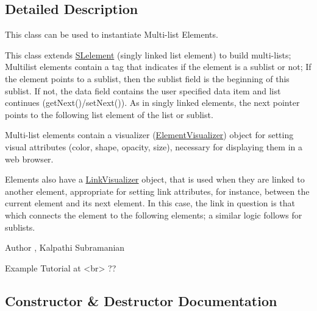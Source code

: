 \subsection{Detailed Description}
This class can be used to instantiate Multi-\/list Elements. 

This class extends \mbox{\hyperlink{namespace_bridges_1_1_s_lelement}{S\+Lelement}} (singly linked list element) to build multi-\/lists; Multilist elements contain a tag that indicates if the element is a sublist or not; If the element points to a sublist, then the sublist field is the beginning of this sublist. If not, the data field contains the user specified data item and list continues (get\+Next()/set\+Next()). As in singly linked elements, the next pointer points to the following list element of the list or sublist.

Multi-\/list elements contain a visualizer (\mbox{\hyperlink{namespace_bridges_1_1_element_visualizer}{Element\+Visualizer}}) object for setting visual attributes (color, shape, opacity, size), necessary for displaying them in a web browser.

Elements also have a \mbox{\hyperlink{namespace_bridges_1_1_link_visualizer}{Link\+Visualizer}} object, that is used when they are linked to another element, appropriate for setting link attributes, for instance, between the current element and its next element. In this case, the link in question is that which connects the element to the following elements; a similar logic follows for sublists.

\begin{DoxyAuthor}{Author}
, Kalpathi Subramanian
\end{DoxyAuthor}
\begin{DoxyVerb}\sa Example Tutorial at <br> ??\end{DoxyVerb}
 

\subsection{Constructor \& Destructor Documentation}
\mbox{\label{class_bridges_1_1_m_lelement_1_1_m_lelement_adf7e1429b30cbd38b593e4266e795650}} 
